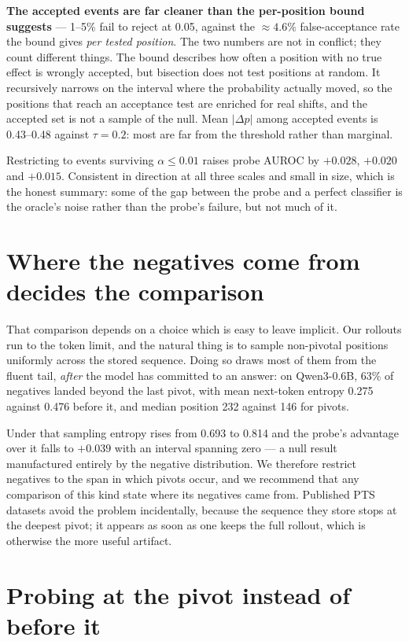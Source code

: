 \documentclass{article}
\newcommand{\pdelta}{\Delta p}
\begin{document}
\textbf{The accepted events are far cleaner than the per-position bound
suggests} --- 1--5\% fail to reject at 0.05, against the $\approx 4.6\%$
false-acceptance rate the bound gives \emph{per tested position}. The two
numbers are not in conflict; they count different things. The bound
describes how often a position with no true effect is wrongly accepted,
but bisection does not test positions at random. It recursively narrows on
the interval where the probability actually moved, so the positions that
reach an acceptance test are enriched for real shifts, and the accepted
set is not a sample of the null. Mean $|\pdelta|$ among accepted events is
0.43--0.48 against $\tau{=}0.2$: most are far from the threshold rather
than marginal.

Restricting to events surviving $\alpha \le 0.01$ raises probe AUROC by
$+0.028$, $+0.020$ and $+0.015$. Consistent in direction at all three
scales and small in size, which is the honest summary: some of the gap
between the probe and a perfect classifier is the oracle's noise rather
than the probe's failure, but not much of it.

\section{Where the negatives come from decides the comparison}
\label{sec:negatives}

That comparison depends on a choice which is easy to leave implicit. Our
rollouts run to the token limit, and the natural thing is to sample
non-pivotal positions uniformly across the stored sequence. Doing so draws
most of them from the fluent tail, \emph{after} the model has committed to
an answer: on Qwen3-0.6B, 63\% of negatives landed beyond the last pivot,
with mean next-token entropy 0.275 against 0.476 before it, and median
position 232 against 146 for pivots.

Under that sampling entropy rises from 0.693 to 0.814 and the probe's
advantage over it falls to $+0.039$ with an interval spanning zero --- a
null result manufactured entirely by the negative distribution. We
therefore restrict negatives to the span in which pivots occur, and we
recommend that any comparison of this kind state where its negatives came
from. Published PTS datasets avoid the problem incidentally, because the
sequence they store stops at the deepest pivot; it appears as soon as one
keeps the full rollout, which is otherwise the more useful artifact.

\section{Probing at the pivot instead of before it}
\label{sec:at-t}
\end{document}
